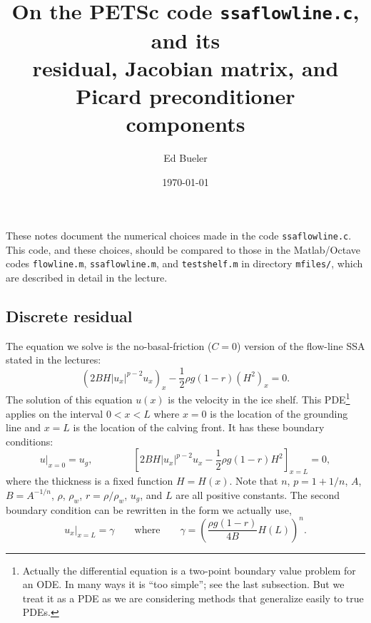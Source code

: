 \documentclass[11pt,final,reqno]{amsart}
\begin{document}
\title[On the PETSc code \texttt{ssaflowline.c}]{On the PETSc code \texttt{ssaflowline.c}, and its \\ residual, Jacobian matrix, and Picard preconditioner \\ components}
\author{Ed Bueler}
\date{\today}
\maketitle

These notes document the numerical choices made in the code \texttt{ssaflowline.c}.  This code, and these choices, should be compared to those in the Matlab/Octave codes \texttt{flowline.m}, \texttt{ssaflowline.m}, and \texttt{testshelf.m} in directory \texttt{mfiles/}, which are described in detail in the lecture.

\subsection*{Discrete residual}   The equation we solve is the no-basal-friction ($C=0$) version of the flow-line SSA stated in the lectures:
\begin{equation}
  \left(2 B H |u_x|^{p-2} u_x\right)_x - \frac{1}{2} \rho g (1-r) \left(H^2\right)_x = 0.  \label{ssa}
\end{equation}
The solution of this equation $u(x)$ is the velocity in the ice shelf.  This PDE\footnote{Actually the differential equation is a two-point boundary value problem for an ODE.  In many ways it is ``too simple''; see the last subsection.  But we treat it as a PDE as we are considering methods that generalize easily to true PDEs.} applies on the interval $0<x<L$ where $x=0$ is the location of the grounding line and $x=L$ is the location of the calving front.  It has these boundary conditions:
\begin{equation}
u\big|_{x=0} = u_g, \qquad\qquad \left[2 B H |u_x|^{p-2} u_x - \frac{1}{2}\rho g (1-r) H^2\right]_{x=L} = 0,
\end{equation}
where the thickness is a fixed function $H=H(x)$.  Note that $n$, $p=1+1/n$, $A$, $B=A^{-1/n}$, $\rho$, $\rho_w$, $r=\rho/\rho_w$, $u_g$, and $L$ are all positive constants.  The second boundary condition can be rewritten in the form we actually use,
\begin{equation}
u_x\big|_{x=L} = \gamma \qquad \text{where} \qquad \gamma = \left(\frac{\rho g (1-r)}{4B} H(L)\right)^n. \tag{2b} \label{neumann}
\end{equation}
\end{document}
